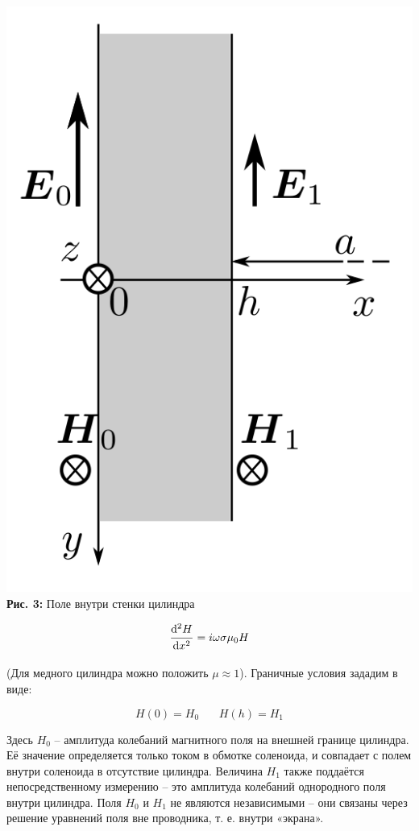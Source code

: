 \documentclass[12pt,a4paper]{scrartcl}
\begin{document}
	\begin{center}
		\includegraphics[scale=0.25]{PIC_3.png}
		\\\textbf{Рис. 3:} Поле внутри стенки цилиндра
	\end{center}
	
	$$\dfrac{\strut \mathrm{d}^2 H}{\strut \mathrm{d} x^2} = i \omega \sigma \mu_0 H$$
	
	(Для медного цилиндра можно положить $\mu \approx 1$). Граничные условия зададим в виде:
	
	$$H(0) = H_0 \ \ \ \ \ \ \ \ H(h) = H_1$$
	
	
	Здесь $H_0$ -- амплитуда колебаний магнитного поля на внешней границе цилиндра. Её значение определяется только током в обмотке соленоида, и совпадает с полем внутри соленоида в отсутствие цилиндра. Величина $H_1$ также поддаётся непосредственному измерению -- это амплитуда колебаний однородного поля внутри цилиндра. Поля $H_0$ и $H_1$ не являются независимыми -- они связаны через решение уравнений поля вне проводника, т. е. внутри «экрана».
	
\end{document}

